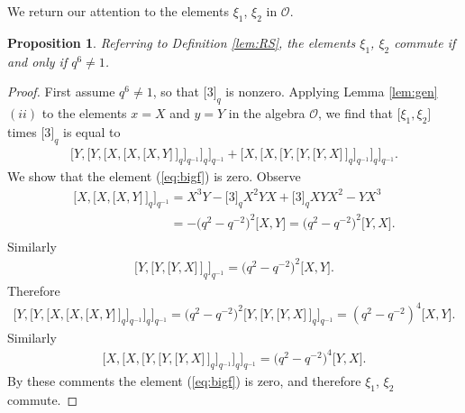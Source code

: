 \documentclass[pdftex]{sigma}
\numberwithin{equation}{section}
\newtheorem{Proposition}[Theorem]{Proposition}
{\theoremstyle{definition}
\newtheorem{Note}[Theorem]{Note}
\newtheorem{Definition}[Theorem]{Definition}
\newtheorem{Problem}[Theorem]{Problem}
}
\begin{document}
We return our attention to the
elements $\xi_1$, $\xi_2$ in $\mathcal O$.

\begin{Proposition}
\label{lem:RS2}
Referring to
Definition {\rm \ref{lem:RS}},
the elements $\xi_1$, $\xi_2$ commute
if and only if
$q^6 \not=1$.
\end{Proposition}

\begin{proof}
First assume
$q^6 \not=1$, so that
$\lbrack 3 \rbrack_q$ is nonzero.
Applying
Lemma
\ref{lem:gen}$(ii)$ to the elements $x=X$ and $y=Y$ in
the algebra $\mathcal O$, we f\/ind that
$\lbrack \xi_1, \xi_2\rbrack $ times $\lbrack 3\rbrack_q$
is equal to
\begin{gather}
\lbrack Y,
\lbrack Y,
\lbrack X,
\lbrack X,
\lbrack X,
Y
\rbrack \,
\rbrack_q
\rbrack_{q^{-1}}
\rbrack_q
\rbrack_{q^{-1}}
+
\lbrack X,
\lbrack X,
\lbrack Y,
\lbrack Y,
\lbrack Y,
X
\rbrack \,
\rbrack_q
\rbrack_{q^{-1}}
\rbrack_q
\rbrack_{q^{-1}}.
\label{eq:bigf}
\end{gather}
We show that the element (\ref{eq:bigf}) is zero.
Observe
\begin{gather*}
\lbrack X,
\lbrack X,
\lbrack X,
Y
\rbrack \,
\rbrack_q
\rbrack_{q^{-1}}
 =
X^3Y-\lbrack 3\rbrack_q X^2YX+\lbrack 3\rbrack_q XYX^2-YX^3
\\
\phantom{\lbrack X,
\lbrack X,
\lbrack X,
Y
\rbrack \,
\rbrack_q
\rbrack_{q^{-1}}}{} = -\big(q^2-q^{-2}\big)^2 \lbrack X,Y \rbrack
= \big(q^2-q^{-2}\big)^2 \lbrack Y,X \rbrack.
\end{gather*}
Similarly
\begin{gather*}
\lbrack Y,
\lbrack Y,
\lbrack Y,
X
\rbrack \,
\rbrack_q
\rbrack_{q^{-1}}
= \big(q^2-q^{-2}\big)^2 \lbrack X,Y \rbrack.
\end{gather*}
Therefore
\begin{gather*}
\lbrack Y,
\lbrack Y,
\lbrack X,
\lbrack X,
\lbrack X,
Y
\rbrack \,
\rbrack_q
\rbrack_{q^{-1}}
\rbrack_q
\rbrack_{q^{-1}}
 =
\big(q^2-q^{-2}\big)^2\lbrack Y,
\lbrack Y,
\lbrack Y,
X
\rbrack \,
\rbrack_q
\rbrack_{q^{-1}}
=
(q^2-q^{-2})^4\lbrack X,Y\rbrack.
\end{gather*}
Similarly
\begin{gather*}
\lbrack X,
\lbrack X,
\lbrack Y,
\lbrack Y,
\lbrack Y,
X
\rbrack \,
\rbrack_q
\rbrack_{q^{-1}}
\rbrack_q
\rbrack_{q^{-1}}
 =
\big(q^2-q^{-2}\big)^4\lbrack Y,X\rbrack .
\end{gather*}
By these comments
the element (\ref{eq:bigf})
is zero, and therefore
$\xi_1$, $\xi_2$ commute.



\end{proof}
\end{document}
